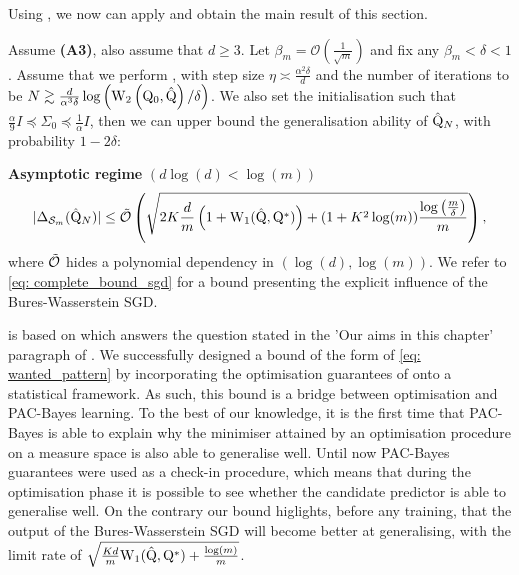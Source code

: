 Using , we now can apply  and obtain the main result of this section.
\begin{theorem}
\label{th: main_sgd}
Assume \textbf{(A3)}, also assume that $d\geq 3$. Let $\beta_m= \mathcal{O}(\frac{1}{\sqrt{m}})$ and fix any $\beta_m<\delta<1$.
Assume that we perform , with step size $\eta \asymp \frac{\alpha^2 \delta}{d}$ and the number of iterations to be $N \gtrsim \frac{d}{\alpha^3 \delta} \log \left(\mathrm{W}_{2}\left(\mathrm{Q}_0, \hat{\mathrm{Q}}\right) / \delta\right)$.
We also set the initialisation such that $\frac{\alpha}{9} I \preceq \Sigma_{0} \preceq \frac{1}{\alpha} I$,
then we can upper bound the generalisation ability of $\hat{\mathrm{Q}}_N$, with probability $1-2\delta$:

\noindent \textbf{Asymptotic regime} $(d\log(d)< \log(m))$
\begin{align*}
|\Delta_{\mathcal{S}_m}(\hat{\mathrm{Q}}_N)|  \leq\Tilde{\mathcal{O}}\left( \sqrt{2K\frac{d}{m}\left(1 + \mathrm{W}_{1}(\hat{\mathrm{Q}},\mathrm{Q}^*)\right)+ (1+K^2\log(m)) \frac{\log\left( \frac{m}{\delta} \right)}{m}} \right),
\end{align*}
where $\Tilde{\mathcal{O}}$ hides a polynomial dependency in $(\log(d),\log(m))$. We refer to \eqref{eq: complete_bound_sgd} for a bound presenting the explicit influence of the Bures-Wasserstein SGD.
\end{theorem}
 is based on  which answers the question stated in the 'Our aims in this chapter' paragraph of . We successfully designed a bound of the form of \eqref{eq: wanted_pattern} by incorporating the optimisation guarantees of \citet{lambert2022variational} onto a statistical framework.
As such, this bound is a bridge between optimisation and PAC-Bayes learning. To the best of our knowledge, it is the first time that PAC-Bayes is able to explain why the minimiser attained by an optimisation procedure on a measure space is also able to generalise well. Until now PAC-Bayes guarantees were used as a check-in procedure, which means that during the optimisation phase it is possible to see whether the candidate predictor is able to generalise well. On the contrary our bound higlights, before any training, that the output of the Bures-Wasserstein SGD will become better at generalising, with the limit rate of $\sqrt{\frac{Kd}{m}\mathrm{W}_{1}(\hat{\mathrm{Q}},\mathrm{Q}^*) + \frac{\log(m)}{m}}$.
\medskip

